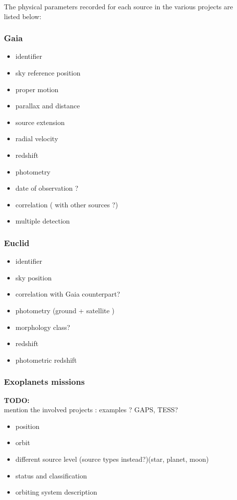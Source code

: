 \documentclass[11pt,a4paper]{ivoa}
\newcommand{\TODO}[1]{%
    \noindent%
    \colorbox{todocolor}{%
            \parbox{0.85\linewidth}{\sffamily \textbf{TODO:}\\
            #1}
    }%
    \vspace{2pt}

}
\begin{document}
The physical parameters recorded for each source in the various projects are listed below:
\subsubsection{Gaia}
\begin{itemize}
    \item identifier
    \item sky reference position
    \item proper motion
    \item parallax and distance

    \item source extension
    \item radial velocity
    \item redshift
    \item photometry
    \item date of observation ?
    \item correlation ( with other sources ?)
    \item multiple detection
\end{itemize}


\subsubsection{Euclid}
\begin{itemize}
    \item identifier
    \item sky position
    \item correlation with Gaia counterpart?
    \item photometry (ground + satellite )
    \item morphology class?
    \item redshift
    \item photometric redshift
\end{itemize}

\subsubsection{Exoplanets missions}
\TODO{mention the involved projects : examples ? GAPS, TESS? }

\begin{itemize}
    \item position
    \item orbit
    \item different source level (source types instead?)(star, planet, moon)
    \item status and classification
    \item orbiting system description
\end{itemize}
\end{document}
